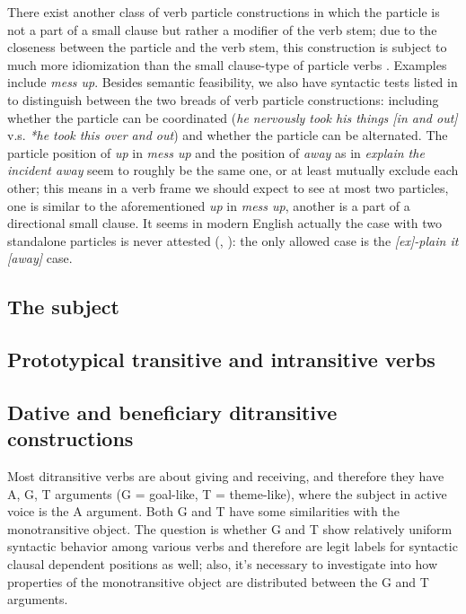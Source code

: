 \documentclass[UTF8, a4paper, oneside, scheme=plain, 12pt]{ctexbook}
\newcommand*{\citepage}[1]{p.~{#1}}
\newcommand{\form}[1]{\emph{#1}}
\begin{document}
There exist another class of verb particle constructions in which 
the particle is not a part of a small clause
but rather a modifier of the verb stem;
due to the closeness between the particle and the verb stem, 
this construction is subject to much more idiomization than 
the small clause-type of particle verbs
\citep{wurmbrand2000structure}.
Examples include \form{mess up}.
Besides semantic feasibility, 
we also have syntactic tests listed in \citet{wurmbrand2000structure} to distinguish 
between the two breads of verb particle constructions:
including whether the particle can be coordinated 
(\form{he nervously took his things [in and out]} 
v.s. \form{*he took this over and out})
and whether the particle can be alternated.
The particle position of \form{up} in \form{mess up} 
and the position of \form{away} as in \form{explain the incident away}
seem to roughly be the same one, 
or at least mutually exclude each other; 
this means in a verb frame we should expect to see at most two particles, 
one is similar to the aforementioned \form{up} in \form{mess up},
another is a part of a directional small clause.
It seems in modern English actually the case with two standalone particles 
is never attested (\citealt[\citepage{293}]{dixon2005semantic}, \citealt[\citepage{286}]{cgel}):  
the only allowed case is the \form{[ex]-plain it [away]} case.

\subsection{The subject}\label{sec:subject}

\subsection{Prototypical transitive and intransitive verbs}



\subsection{Dative and beneficiary ditransitive constructions}

Most ditransitive verbs are about giving and receiving,
and therefore they have A, G, T arguments (G = goal-like, T = theme-like),
where the subject in active voice is the A argument.
Both G and T have some similarities with the monotransitive object. 
The question is whether G and T show relatively uniform syntactic behavior
among various verbs
and therefore are legit labels for syntactic clausal dependent positions as well;
also, it's necessary to investigate into how properties of the monotransitive object 
are distributed between the G and T arguments.
\end{document}
